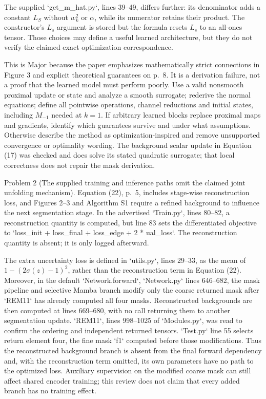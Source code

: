 \documentclass[10pt]{article}
\begin{document}
The supplied `get\_m\_hat.py`, lines 39–49, differs further: its denominator adds a constant \(L_S\) without \(w_k^2\) or \(\alpha\), while its numerator retains their product. The constructor’s \(L_s\) argument is stored but the formula resets \(L_s\) to an all-ones tensor. Those choices may define a useful learned architecture, but they do not verify the claimed exact optimization correspondence.\par
This is Major because the paper emphasizes mathematically strict connections in Figure 3 and explicit theoretical guarantees on p. 8. It is a derivation failure, not a proof that the learned model must perform poorly. Use a valid nonsmooth proximal update or state and analyze a smooth surrogate; rederive the normal equations; define all pointwise operations, channel reductions and initial states, including \(M_{-1}\) needed at \(k=1\). If arbitrary learned blocks replace proximal maps and gradients, identify which guarantees survive and under what assumptions. Otherwise describe the method as optimization-inspired and remove unsupported convergence or optimality wording. The background scalar update in Equation (17) was checked and does solve its stated quadratic surrogate; that local correctness does not repair the mask derivation.\par
Problem 2 (The supplied training and inference paths omit the claimed joint unfolding mechanism).  Equation (22), p. 5, includes stage-wise reconstruction loss, and Figures 2–3 and Algorithm S1 require a refined background to influence the next segmentation stage. In the advertised `Train.py`, lines 80–82, a reconstruction quantity is computed, but line 83 sets the differentiated objective to `loss\_init + loss\_final + loss\_edge + 2 * ual\_loss`. The reconstruction quantity is absent; it is only logged afterward.\par
The extra uncertainty loss is defined in `utils.py`, lines 29–33, as the mean of \(1-(2\sigma(z)-1)^2\), rather than the reconstruction term in Equation (22). Moreover, in the default `Network.forward`, `Network.py` lines 646–682, the mask pipeline and selective Mamba branch modify only the coarse returned mask after `REM11` has already computed all four masks. Reconstructed backgrounds are then computed at lines 669–680, with no call returning them to another segmentation update. `REM11`, lines 998–1025 of `Modules.py`, was read to confirm the ordering and independent returned tensors. `Test.py` line 55 selects return element four, the fine mask `f1` computed before those modifications. Thus the reconstructed background branch is absent from the final forward dependency and, with the reconstruction term omitted, its own parameters have no path to the optimized loss. Auxiliary supervision on the modified coarse mask can still affect shared encoder training; this review does not claim that every added branch has no training effect.\par
\end{document}
